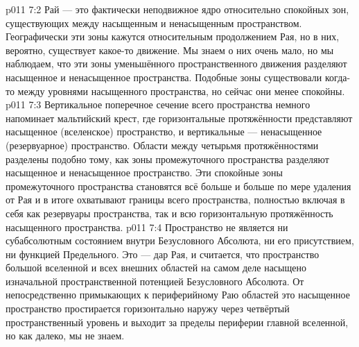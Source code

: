 \vs p011 7:2 Рай --- это фактически неподвижное ядро относительно спокойных зон, существующих между насыщенным и ненасыщенным пространством. Географически эти зоны кажутся относительным продолжением Рая, но в них, вероятно, существует какое\hyp{}то движение. Мы знаем о них очень мало, но мы наблюдаем, что эти зоны уменьшённого пространственного движения разделяют насыщенное и ненасыщенное пространства. Подобные зоны существовали когда\hyp{}то между уровнями насыщенного пространства, но сейчас они менее спокойны.
\vs p011 7:3 Вертикальное поперечное сечение всего пространства немного напоминает мальтийский крест, где горизонтальные протяжённости представляют насыщенное (вселенское) пространство, и вертикальные --- ненасыщенное (резервуарное) пространство. Области между четырьмя протяжённостями разделены подобно тому, как зоны промежуточного пространства разделяют насыщенное и ненасыщенное пространство. Эти спокойные зоны промежуточного пространства становятся всё больше и больше по мере удаления от Рая и в итоге охватывают границы всего пространства, полностью включая в себя как резервуары пространства, так и всю горизонтальную протяжённость насыщенного пространства.
\vs p011 7:4 \pc Пространство не является ни субабсолютным состоянием внутри Безусловного Абсолюта, ни его присутствием, ни функцией Предельного. Это --- дар Рая, и считается, что пространство большой вселенной и всех внешних областей на самом деле насыщено изначальной пространственной потенцией Безусловного Абсолюта. От непосредственно примыкающих к периферийному Раю областей это насыщенное пространство простирается горизонтально наружу через четвёртый пространственный уровень и выходит за пределы периферии главной вселенной, но как далеко, мы не знаем.
